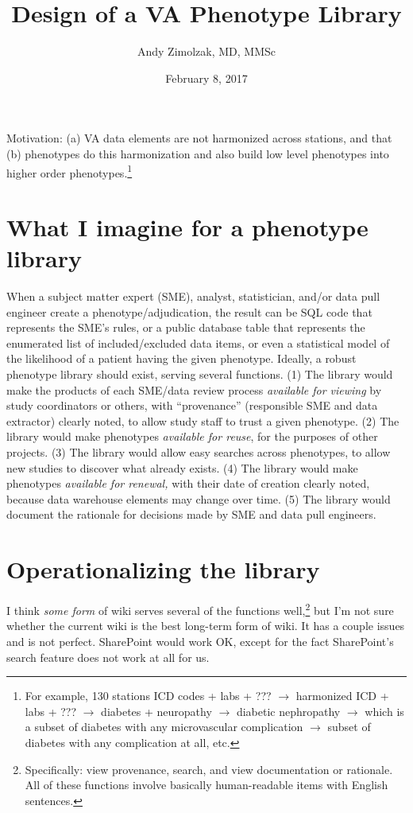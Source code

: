 \documentclass{tufte-handout}
\title{Design of a VA Phenotype Library}
\author{Andy Zimolzak, MD, MMSc}
\date{February 8, 2017}
\begin{document}
\maketitle

Motivation: (a) VA data elements are not harmonized across stations,
and that (b) phenotypes do this harmonization and also build low level
phenotypes into higher order phenotypes.\footnote{For example, 130
  stations ICD codes + labs + ??? $\to$ harmonized ICD + labs + ???
  $\to$ diabetes + neuropathy $\to$ diabetic nephropathy $\to$ which
  is a subset of diabetes with any microvascular complication $\to$
  subset of diabetes with any complication at all, etc.}

\section{What I imagine for a phenotype library}

When a subject matter expert (SME), analyst, statistician, and/or data
pull engineer create a phenotype/adjudication, the result can be SQL
code that represents the SME's rules, or a public database table that
represents the enumerated list of included/excluded data items, or
even a statistical model of the likelihood of a patient having the
given phenotype. Ideally, a robust phenotype library should exist,
serving several functions. (1) The library would make the products of
each SME/data review process \emph{available for viewing} by study
coordinators or others, with ``provenance'' (responsible SME and data
extractor) clearly noted, to allow study staff to trust a given
phenotype. (2) The library would make phenotypes \emph{available for
  reuse}, for the purposes of other projects. (3) The library would
allow easy searches across phenotypes, to allow new studies to
discover what already exists. (4) The library would make phenotypes
\emph{available for renewal,} with their date of creation clearly
noted, because data warehouse elements may change over time. (5) The
library would document the rationale for decisions made by SME and
data pull engineers.

\section{Operationalizing the library}

I think \emph{some form} of wiki serves several of the functions
well,\footnote{Specifically: view provenance, search, and view
  documentation or rationale. All of these functions involve basically
  human-readable items with English sentences.} but I'm not sure
whether the current wiki is the best long-term form of wiki. It has a
couple issues and is not perfect. SharePoint would work OK, except for
the fact SharePoint's search feature does not work at all for us.
\end{document}
